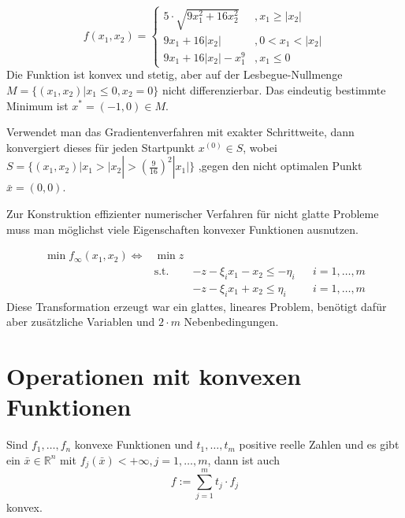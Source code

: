 \begin{Beispiel}
\begin{equation}
 f(x_1,x_2) =
 \begin{cases}
  5\cdot\sqrt{9x_1^2+16x_2^2} 	& ,x_1\geq |x_2|\\
  9x_1+16|x_2| 			& ,0<x_1<|x_2|\\
  9x_1+16|x_2|-x_1^9 		& ,x_1\leq 0
 \end{cases}
\end{equation}
Die Funktion ist konvex und stetig, aber auf der Lesbegue-Nullmenge $M=\{(x_1,x_2)|x_1\leq 0,x_2=0\}$ nicht 
differenzierbar. Das eindeutig bestimmte Minimum ist $x^*=(-1,0)\in M$.

Verwendet man das Gradientenverfahren mit exakter Schrittweite, dann konvergiert dieses für jeden Startpunkt 
$x^{(0)}\in S$, wobei $S=\{(x_1,x_2)|x_1>|x_2|>(\frac{9}{16})^2|x_1|\}$ ,gegen den nicht optimalen Punkt 
$\bar{x}=(0,0)$.

Zur Konstruktion effizienter numerischer Verfahren für nicht glatte Probleme muss man möglichst viele 
Eigenschaften konvexer Funktionen ausnutzen.
\end{Beispiel}

\begin{Beispiel}
 \begin{align*}
  \min f_\infty(x_1,x_2) \Leftrightarrow & \min z\\
  & \text{s.t.} & -z-\xi_i x_1-x_2 \leq -\eta_i & & i = 1,\dots,m\\
  & & -z-\xi_i x_1+x_2 \leq \eta_i & & i = 1,\dots,m
 \end{align*}
 Diese Transformation erzeugt war ein glattes, lineares Problem, benötigt dafür aber zusätzliche Variablen und 
$2\cdot m$ Nebenbedingungen.
\end{Beispiel}

\section{Operationen mit konvexen Funktionen}
\begin{Lemma}
 Sind $f_1,\dots,f_n$ konvexe Funktionen und $t_1,\dots,t_m$ positive reelle Zahlen und es gibt ein 
$\bar{x}\in\mathbb{R}^n$ mit $f_j(\bar{x})<+\infty,j=1,\dots,m$, dann ist auch 
\begin{equation}
 f:=\sum\limits_{j=1}^m t_j\cdot f_j
\end{equation}
konvex.
\end{Lemma}


